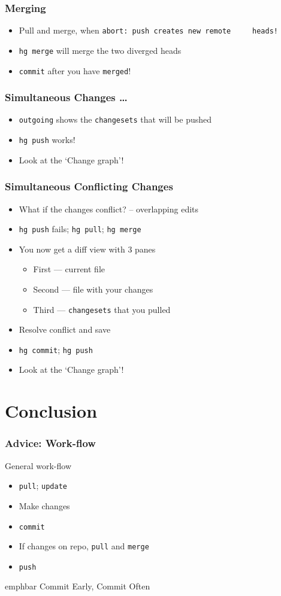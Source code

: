 \documentclass[14pt,compress]{beamer}
\newcommand{\emphbar}[1]
{\begin{beamercolorbox}[rounded=true]{emphbar} 
      {#1}
 \end{beamercolorbox}
}
\newcommand{\typ}[1]{\lstinline{#1}}
\begin{document}
\begin{frame}
  \frametitle{Merging}
  \begin{itemize}
  \item Pull and merge, when \typ{abort: push creates new remote
    heads!}
  \item \typ{hg merge} will merge the two diverged heads
  \item \typ{commit} after you have \typ{merged}!
  \end{itemize}
\end{frame}

\begin{frame}
  \frametitle{Simultaneous Changes \ldots}
  \begin{itemize}
  \item \typ{outgoing} shows the \typ{changesets} that will be pushed
  \item \typ{hg push} works!
  \item Look at the `Change graph'!
  \end{itemize}
\end{frame}

\begin{frame}
  \frametitle{Simultaneous Conflicting Changes}
  \begin{itemize}
  \item What if the changes conflict? -- overlapping edits
  \item \typ{hg push} fails; \typ{hg pull}; \typ{hg merge}
  \item You now get a diff view with 3 panes 
    \begin{itemize}
    \item First --- current file
    \item Second --- file with your changes
    \item Third --- \typ{changesets} that you pulled
    \end{itemize}
  \item Resolve conflict and save
  \item \typ{hg commit}; \typ{hg push}
  \item Look at the `Change graph'!
  \end{itemize}
\end{frame}

\section{Conclusion}

\begin{frame}
  \frametitle{\alert{Advice}: Work-flow}
  General work-flow
  \begin{itemize}
  \item \typ{pull}; \typ{update}
  \item Make changes
  \item \typ{commit}
  \item If changes on repo, \typ{pull} and \typ{merge}
  \item \typ{push}
  \end{itemize}
  \emphbar{Commit Early, Commit Often}
\end{frame}
\end{document}
